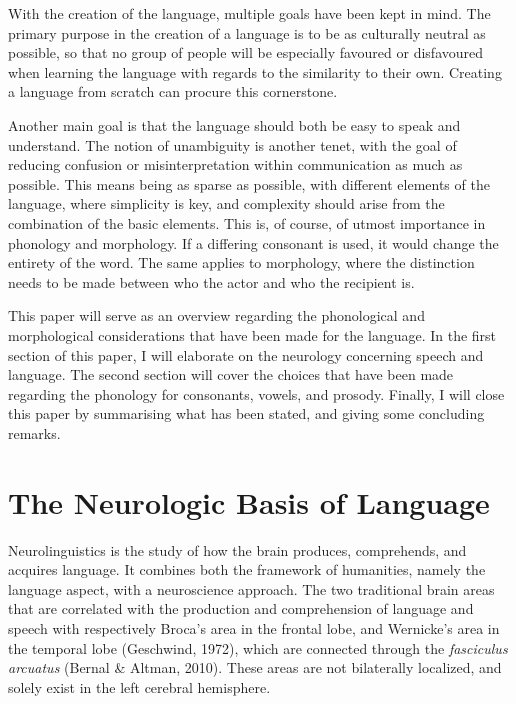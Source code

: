 With the creation of the language, multiple goals have been kept in mind. The primary purpose in the creation of a language is to be as culturally neutral as possible, so that no group of people will be especially favoured or disfavoured when learning the language with regards to the similarity to their own. Creating a language from scratch can procure this cornerstone. 

Another main goal is that the language should both be easy to speak and understand. The notion of unambiguity is another tenet, with the goal of reducing confusion or misinterpretation within communication as much as possible. This means being as sparse as possible, with different elements of the language, where simplicity is key, and complexity should arise from the combination of the basic elements. This is, of course, of utmost importance in phonology and morphology. If a differing consonant is used, it would change the entirety of the word. The same applies to morphology, where the distinction needs to be made between who the actor and who the recipient is. 

This paper will serve as an overview regarding the phonological and morphological considerations that have been made for the language. In the first section of this paper, I will elaborate on the neurology concerning speech and language. The second section will cover the choices that have been made regarding the phonology for consonants, vowels, and prosody. Finally, I will close this paper by summarising what has been stated, and giving some concluding remarks.



\section{\hspace{-0.3cm}The Neurologic Basis of Language}

Neurolinguistics is the study of how the brain produces, comprehends, and acquires language. 
It combines both the framework of humanities, namely the language aspect, with a neuroscience approach. The two traditional brain areas that are correlated with the production and comprehension of language and speech with respectively Broca’s area in the frontal lobe, and Wernicke’s area in the temporal lobe (Geschwind, 1972), which are connected through the \textit{fasciculus arcuatus} (Bernal \& Altman, 2010). These areas are not bilaterally localized, and solely exist in the left cerebral hemisphere. 

